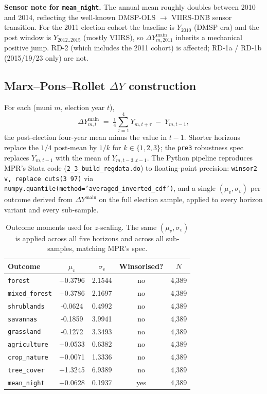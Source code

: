\documentclass[11pt]{article}
\begin{document}
\textbf{Sensor note for \texttt{mean\_night}.} The annual mean
roughly doubles between 2010 and 2014, reflecting the well-known
DMSP-OLS $\to$ VIIRS-DNB sensor transition. For the 2011 election
cohort the baseline is $Y_{2010}$ (DMSP era) and the post window is
$Y_{2012..2015}$ (mostly VIIRS), so $\Delta Y^{\text{main}}_{m,2011}$
inherits a mechanical positive jump. RD-2 (which includes the 2011
cohort) is affected; RD-1a / RD-1b (2015/19/23 only) are not.

\subsection{Marx--Pons--Rollet $\Delta Y$ construction}

For each (muni $m$, election year $t$),
\[
\Delta Y^{\text{main}}_{m,t}
  \;=\; \tfrac{1}{4}\sum_{\tau=1}^{4} Y_{m,t+\tau}
  \;-\; Y_{m,t-1},
\]
the post-election four-year mean minus the value in $t-1$. Shorter
horizons replace the $1/4$ post-mean by $1/k$ for $k\in\{1,2,3\}$;
the \texttt{pre3} robustness spec replaces $Y_{m,t-1}$ with the
mean of $Y_{m,t-3..t-1}$. The Python pipeline reproduces MPR's
Stata code (\texttt{2\_3\_build\_regdata.do}) to floating-point
precision: \texttt{winsor2 v, replace cuts(3 97)} via
\texttt{numpy.quantile(method='averaged\_inverted\_cdf')}, and a
single $(\mu_v, \sigma_v)$ per outcome derived from
$\Delta Y^{\text{main}}$ on the full election sample, applied to
every horizon variant and every sub-sample.

\begin{table}[H]
\centering
\small
\caption{Outcome moments used for $z$-scaling. The same $(\mu_v,\sigma_v)$
is applied across all five horizons and across all sub-samples,
matching MPR's spec.}
\label{tab:moments}
\begin{tabular}{l c c c c}
\toprule
Outcome & $\mu_v$ & $\sigma_v$ & Winsorised? & $N$ \\
\midrule
\texttt{forest} & +0.3796 & 2.1544 & no & 4,389 \\
\texttt{mixed\_forest} & +0.3786 & 2.1697 & no & 4,389 \\
\texttt{shrublands} & -0.0624 & 0.4992 & no & 4,389 \\
\texttt{savannas} & -0.1859 & 3.9941 & no & 4,389 \\
\texttt{grassland} & -0.1272 & 3.3493 & no & 4,389 \\
\texttt{agriculture} & +0.0533 & 0.6382 & no & 4,389 \\
\texttt{crop\_nature} & +0.0071 & 1.3336 & no & 4,389 \\
\texttt{tree\_cover} & +1.3245 & 6.9389 & no & 4,389 \\
\texttt{mean\_night} & +0.0628 & 0.1937 & yes & 4,389 \\
\bottomrule
\end{tabular}
\end{table}
\end{document}
